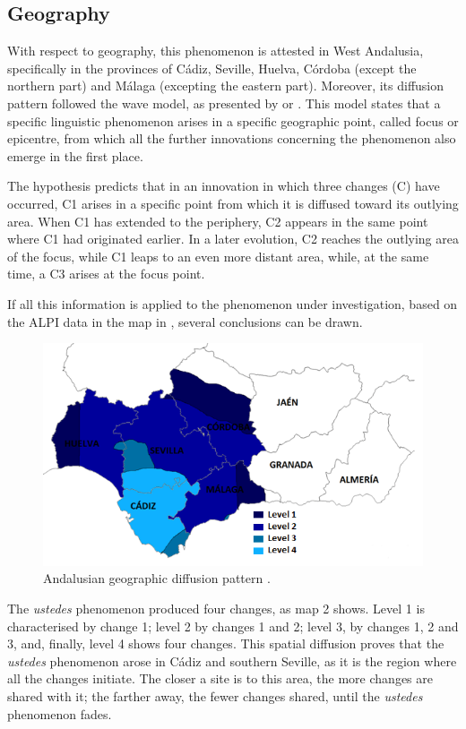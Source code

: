 \documentclass[output=paper]{LSP/langsci}
\begin{document}
\subsection{Geography}
With respect to geography, this phenomenon is attested in West Andalusia, specifically in the provinces of Cádiz, Seville, Huelva, Córdoba (except the northern part) and Málaga (excepting the eastern part). Moreover, its diffusion pattern followed the wave model, as presented by \citet{chambers_dialectology_1980} or \citet{wolfram_dialectology_2003}. This model states that a specific linguistic phenomenon arises in a specific geographic point, called focus or epicentre, from which all the further innovations concerning the phenomenon also emerge in the first place. 

The hypothesis predicts that in an innovation in which three changes (C) have occurred, C1 arises in a specific point from which it is diffused toward its outlying area. When C1 has extended to the periphery, C2 appears in the same point where C1 had originated earlier. In a later evolution, C2 reaches the outlying area of the focus, while C1 leaps to an even more distant area, while, at the same time, a C3 arises at the focus point.

If all this information is applied to the phenomenon under investigation, based on the ALPI data in the map in , several conclusions can be drawn.

\begin{figure}
\includegraphics[width=\textwidth]{illustrations/lara_fig2}
 \caption{Andalusian geographic diffusion pattern \citep[85]{lara_ustedes_2012}.}
\label{lara_fig2}
\end{figure}

The \textit{ustedes} phenomenon produced four changes, as map 2 shows. Level 1 is characterised by change 1; level 2 by changes 1 and 2; level 3, by changes 1, 2 and 3, and, finally, level 4 shows four changes. This spatial diffusion proves that the \textit{ustedes} phenomenon arose in Cádiz and southern Seville, as it is the region where all the changes initiate. The closer a site is to this area, the more changes are shared with it; the farther away, the fewer changes shared, until the \textit{ustedes} phenomenon fades.  
\end{document}
